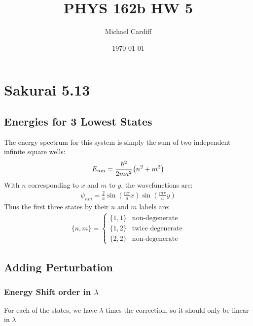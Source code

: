 \documentclass[12pt]{article}
\title{\vspace{-3em}PHYS 162b HW 5}
\author{Michael Cardiff}
\date{\today}
\begin{document}
\maketitle

\section{Sakurai 5.13}
\subsection{Energies for 3 Lowest States}
The energy spectrum for this system is simply the sum of two independent infinite square wells:
\begin{align*}
  E_{nm}=\frac{\hbar^2}{2ma^2}\qty(n^2+m^2)
\end{align*}
With $n$ corresponding to $x$ and $m$ to $y$, the wavefunctions are:
\begin{align*}
  \psi_{nm}=\frac2a\sin(\frac{n\pi}ax)\sin(\frac{m\pi}ay)
\end{align*}
Thus the first three states by their $n$ and $m$ labels are:
\begin{align}
\boxed{\{n,m\}=
  \begin{cases}
    \{1,1\} &\text{non-degenerate} \\
    \{1,2\} &\text{twice degenerate} \\
    \{2,2\} &\text{non-degenerate}
  \end{cases}}
\end{align}

\subsection{Adding Perturbation}
\subsubsection{Energy Shift order in $\lambda$}
For each of the states, we have $\lambda$ times the correction, so it should only be linear in $\lambda$
\end{document}
